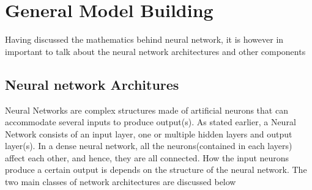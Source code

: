 \documentclass[a4paper,11pt,oneside]{book}
\begin{document}
 \section{General Model Building}
 Having discussed the mathematics behind neural network, it is however in important to talk about the neural network architectures and other components
 \subsection{Neural network Architures}
 Neural Networks are complex structures made of artificial neurons that can accommodate several inputs to produce output(s). As stated earlier, a Neural Network consists of an input layer, one or multiple hidden layers and output layer(s). In a dense neural network, all the neurons(contained in each layers) affect each other, and hence, they are all connected. How the input neurons produce a certain output is depends
 on the structure of the neural network. The two main classes of network architectures are discussed below
\end{document}
